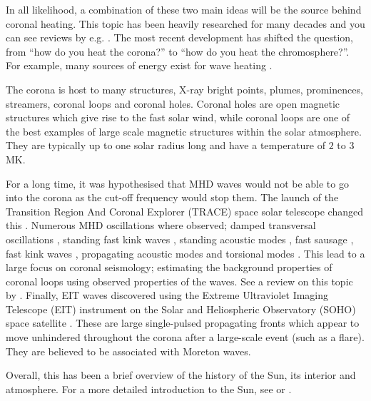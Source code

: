    In all likelihood, a combination of these two main ideas will be the source behind coronal heating.
    This topic has been heavily researched for many decades and you can see reviews by e.g. \cite{erdelyi2004heating,Parnell2012}.
    The most recent development has shifted the question, from ``how do you heat the corona?'' to ``how do you heat the chromosphere?''\citep{Aschwanden2007}.
    For example, many sources of energy exist for wave heating \citep{Parnell2012}.
    
    The corona is host to many structures, X-ray bright points, plumes, prominences, streamers, coronal loops and coronal holes.
    Coronal holes are open magnetic structures which give rise to the fast solar wind, while coronal loops are one of the best examples of large scale magnetic structures within the solar atmosphere.
    They are typically up to one solar radius long and have a temperature of $2$ to $3$ MK.
    
    For a long time, it was hypothesised that MHD waves would not be able to go into the corona as the cut-off frequency would stop them.
    The launch of the Transition Region And Coronal Explorer (TRACE) space solar telescope changed this \citep{TRACE,TRACE1}.
    Numerous MHD oscillations where observed; damped transversal oscillations \citep{8007,2002A&A...394L..39G}, standing fast kink waves \citep{1999ApJ520880A,1999Sci...285..862N,1999SoPh..187..261S}, standing acoustic modes \citep{2003A&A...406.1105W}, fast sausage \citep{2001MNRAS.326..428W,2002MNRAS.336..747W,2003A&A...406..709K}, fast kink waves \citep{2005A&A...430L..65V}, propagating acoustic modes \citep{1997ApJ...491L.111O,2000A&A...355L..23D,2002A&A...393..649M} and torsional modes \citep{1998A&A...337..287E}. 
    This lead to a large focus on coronal seismology; estimating the background properties of coronal loops using observed properties of the waves.
    See a review on this topic by \cite{lrsp-2005-3}.
    Finally, EIT waves discovered using the Extreme Ultraviolet Imaging Telescope (EIT) instrument on the Solar and Heliospheric Observatory (SOHO) space satellite \citep{1998GeoRL..25.2465T}.
    These are large single-pulsed propagating fronts which appear to move unhindered throughout the corona after a large-scale event (such as a flare).
    They are believed to be associated with Moreton waves.
        
    Overall, this has been a brief overview of the history of the Sun, its interior and atmosphere. 
    For a more detailed introduction to the Sun, see \cite{priest1984solar} or \cite{2014masu.book.....P}.
    
